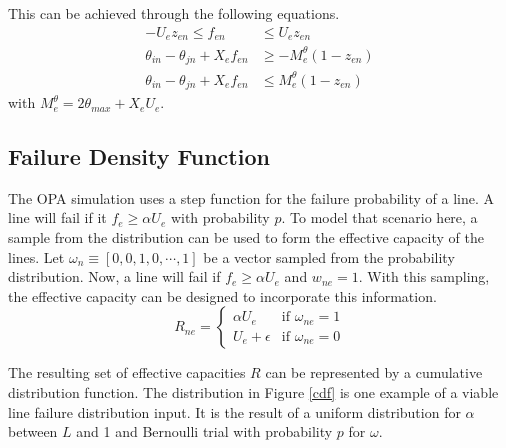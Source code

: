 This can be achieved through the following equations.
\begin{align}
-U_{e} z_{en} \le f_{en} &\le U_{e} z_{en}	\label{lf1}\\
\theta_{in} - \theta_{jn} + X_e f_{en} &\ge -M^\theta_e(1-z_{en}) \label{lf2} \\
\theta_{in} - \theta_{jn} + X_e f_{en} &\le M^\theta_e(1-z_{en})  \label{lf3}
\end{align}
with $M^\theta_e = 2 \theta_{max} + X_e U_e$.


\subsection*{Failure Density Function}
The OPA simulation uses a step function for the failure probability of a line.  A line will fail if it $f_e \ge \alpha U_e$ with probability $p$.    To model that scenario here, a sample from the distribution can be used to form the effective capacity of the lines.  Let $\omega_n \equiv\left[ 0, 0, 1, 0, \cdots, 1\right]$  be a vector sampled from the probability distribution.  Now, a line will fail if $f_e \ge \alpha U_e$ and $w_{ne} =1$.  With this sampling, the effective capacity can be designed to incorporate this information.    
\begin{equation}
 R_{ne} = 
 \left\{ 
	\begin{array}{lr}
				\alpha U_e & \mbox{if } \omega_{ne}=1\\
			  U_e + \epsilon & \mbox{if } \omega_{ne}=0
	\end{array}
 \right. \label{r}
\end{equation}

The resulting set of effective capacities $R$ can be represented by a cumulative distribution function. The distribution in Figure \ref{cdf} is one example of a viable line failure distribution input.  It is the result of a uniform distribution for $\alpha$ between $L$ and 1 and Bernoulli trial with probability $p$ for $\omega$.  


